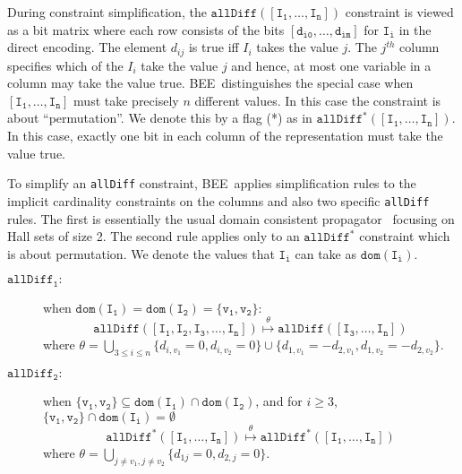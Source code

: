 \documentclass{tlp}
\newcommand{\bee}{\textsf{BEE}}
\begin{document}
During constraint simplification, the
$\mathtt{allDiff([I_1,\ldots,I_n])}$ constraint is viewed as a bit
matrix where each row consists of the bits
$\mathtt{[d_{i0},\ldots,d_{im}]}$ for $\mathtt{I_i}$ in the direct
encoding. The element $d_{ij}$ is true iff $I_i$ takes the value $j$.
The $j^{th}$ column specifies which of the $I_i$ take the value $j$
and hence, at most one variable in a column may take the value true.
\bee\ distinguishes the special case when $\mathtt{[I_1,\ldots,I_n]}$
must take precisely $n$ different values. In this case the constraint
is about ``permutation''. We denote this by a flag (*) as in
$\mathtt{allDiff^*([I_1,\ldots,I_n])}$. In this case, exactly one bit
in each column of the representation must take the value true.

To simplify an \texttt{allDiff} constraint, \bee\ applies
simplification rules to the implicit cardinality constraints on the
columns and also two specific \texttt{allDiff} rules. The first is
essentially the usual domain consistent propagator~\cite{regin}
focusing on Hall sets of size 2. The second rule applies only to an
$\mathtt{allDiff^*}$ constraint which is about permutation.
We denote the values that $\mathtt{I_i}$ can take as
$\mathtt{dom(I_i)}$.

\begin{description}
\item[$\mathtt{allDiff_1}:$]  
 when $\mathtt{dom(I_1) = dom(I_2)=\{v_1,v_2\}}$:
\[
\mathtt{allDiff([I_1,I_2,I_3,\ldots,I_n])}
\overset{\theta}{\longmapsto}
\mathtt{allDiff([I_3,\ldots,I_n])}
\]
  where $\theta = \bigcup_{3\leq i\leq n}
                    \{d_{i,v_1}=0, d_{i,v_2}=0\} \cup
                 \{d_{1,v_1}= -d_{2,v_1}, d_{1,v_2}= -d_{2,v_2}  \}$.


\item[$\mathtt{allDiff_2}:$]  when
  $\mathtt{\{v_1,v_2\}\subseteq dom(I_1)\cap dom(I_2)}$,
   and for $i\geq 3$,
  $\mathtt{\{v_1,v_2\}\cap dom(I_i)=\emptyset}$ 
\[
\mathtt{allDiff^*([I_1,\ldots,I_n])}
\overset{\theta}{\longmapsto}
\mathtt{allDiff^*([I_1,\ldots,I_n])}
\]
  where $\theta = \bigcup_{j\neq v_1, j\neq v_2}\{d_{1j}=0, d_{2,j}=0\}$.


\end{description}
\end{document}
